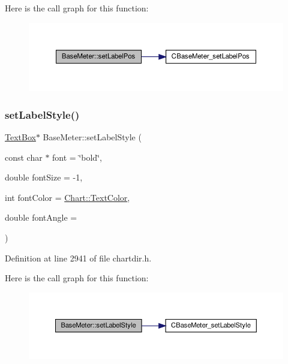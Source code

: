 Here is the call graph for this function\+:
\nopagebreak
\begin{figure}[H]
\begin{center}
\leavevmode
\includegraphics[width=350pt]{class_base_meter_ace5fe7e4565e651924666b02ae69da65_cgraph}
\end{center}
\end{figure}
\mbox{\label{class_base_meter_af491dea34df9191d9d78abeb0a97172e}} 
\subsubsection{\texorpdfstring{set\+Label\+Style()}{setLabelStyle()}}
{\footnotesize\ttfamily \hyperlink{class_text_box}{Text\+Box}$\ast$ Base\+Meter\+::set\+Label\+Style (\begin{DoxyParamCaption}\item[{const char $\ast$}]{font = {\ttfamily \char`\"{}bold\char`\"{}},  }\item[{double}]{font\+Size = {\ttfamily -\/1},  }\item[{int}]{font\+Color = {\ttfamily \hyperlink{namespace_chart_abee0d882fdc9ad0b001245ad9fc64011a879e14f2f5024caccc047374342321ef}{Chart\+::\+Text\+Color}},  }\item[{double}]{font\+Angle = {} }\end{DoxyParamCaption})\hspace{0.3cm}{\ttfamily [inline]}}



Definition at line 2941 of file chartdir.\+h.

Here is the call graph for this function\+:
\nopagebreak
\begin{figure}[H]
\begin{center}
\leavevmode
\includegraphics[width=350pt]{class_base_meter_af491dea34df9191d9d78abeb0a97172e_cgraph}
\end{center}
\end{figure}
\mbox{\label{class_base_meter_a356cadb2071ff42164974e5809840f5f}} 
